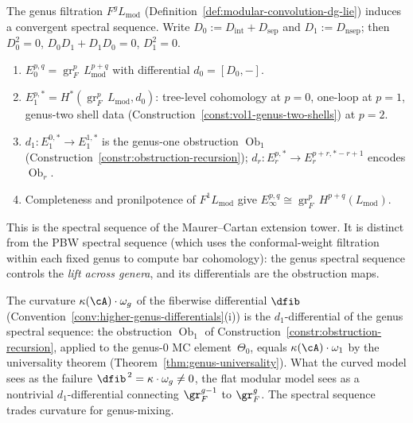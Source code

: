 \begin{construction}
\label{const:vol1-genus-spectral-sequence}
The genus filtration $F^g L_{\mathrm{mod}}$
(Definition~\ref{def:modular-convolution-dg-lie}) induces a
convergent spectral sequence.  Write
$D_0:=D_{\mathrm{int}}+D_{\mathrm{sep}}$ and
$D_1:=D_{\mathrm{nsep}}$; then $D_0^2=0$,
$D_0D_1+D_1D_0=0$, $D_1^2=0$.
\begin{enumerate}[label=\textup{(\roman*)}]
\item $E_0^{p,q} = \operatorname{gr}_F^p\, L_{\mathrm{mod}}^{p+q}$
  with differential $d_0 = [D_0, -]$.
\item $E_1^{p,*} = H^*(\operatorname{gr}_F^p\, L_{\mathrm{mod}},
  d_0)$: tree-level cohomology at $p=0$, one-loop at $p=1$,
  genus-two shell data
  (Construction~\ref{const:vol1-genus-two-shells}) at $p=2$.
\item $d_1\colon E_1^{0,*}\to E_1^{1,*}$ is the genus-one
  obstruction $\operatorname{Ob}_1$
  (Construction~\ref{constr:obstruction-recursion});
  $d_r\colon E_r^{p,*}\to E_r^{p+r,*-r+1}$ encodes
  $\operatorname{Ob}_r$.
\item Completeness and pronilpotence of $F^1 L_{\mathrm{mod}}$ give
  $E_\infty^{p,q}\cong \operatorname{gr}_F^p\, H^{p+q}(L_{\mathrm{mod}})$.
\end{enumerate}
This is the spectral sequence of the Maurer--Cartan extension tower.
It is distinct from the PBW spectral sequence (which uses the
conformal-weight filtration within each fixed genus to compute bar
cohomology): the genus spectral sequence controls the
\emph{lift across genera}, and its differentials are the obstruction
maps.
\end{construction}

\begin{remark}
\label{rem:vol1-curvature-as-d1}
The curvature $\kappa(\cA) \cdot \omega_g$ of the fiberwise
differential $\dfib$
(Convention~\ref{conv:higher-genus-differentials}(i))
is the $d_1$-differential of the genus spectral sequence:
the obstruction $\operatorname{Ob}_1$ of
Construction~\ref{constr:obstruction-recursion},
applied to the genus-$0$ MC element~$\Theta_0$,
equals $\kappa(\cA) \cdot \omega_1$ by the universality
theorem (Theorem~\ref{thm:genus-universality}).
What the curved model sees as the failure
$\dfib^{\,2} = \kappa \cdot \omega_g \neq 0$, the flat
modular model sees as a nontrivial $d_1$-differential
connecting $\gr_F^{g-1}$ to $\gr_F^g$.  The spectral
sequence trades curvature for genus-mixing.
\end{remark}

